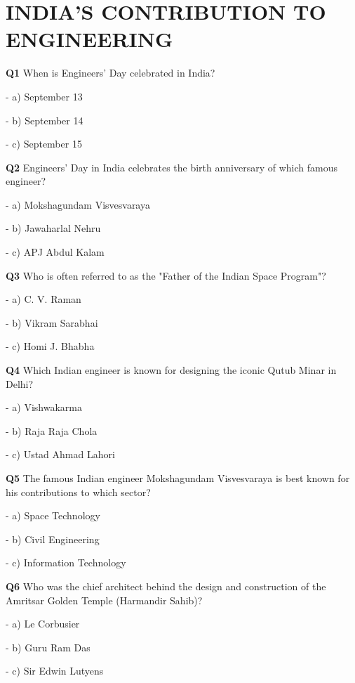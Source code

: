 \section{INDIA'S CONTRIBUTION TO ENGINEERING}

\textbf{Q1} When is Engineers' Day celebrated in India?\par
\quad - a) September 13\par
\quad - b) September 14\par
\quad - c) September 15\par

\textbf{Q2} Engineers' Day in India celebrates the birth anniversary of which famous engineer?\par
\quad - a) Mokshagundam Visvesvaraya\par
\quad - b) Jawaharlal Nehru\par
\quad - c) APJ Abdul Kalam\par

\textbf{Q3} Who is often referred to as the "Father of the Indian Space Program"?\par
\quad - a) C. V. Raman\par
\quad - b) Vikram Sarabhai\par
\quad - c) Homi J. Bhabha\par

\textbf{Q4} Which Indian engineer is known for designing the iconic Qutub Minar in Delhi?\par
\quad - a) Vishwakarma\par
\quad - b) Raja Raja Chola\par
\quad - c) Ustad Ahmad Lahori\par

\textbf{Q5} The famous Indian engineer Mokshagundam Visvesvaraya is best known for his contributions to which sector?\par
\quad - a) Space Technology\par
\quad - b) Civil Engineering\par
\quad - c) Information Technology\par

\textbf{Q6} Who was the chief architect behind the design and construction of the Amritsar Golden Temple (Harmandir Sahib)?\par
\quad - a) Le Corbusier\par
\quad - b) Guru Ram Das\par
\quad - c) Sir Edwin Lutyens\par

